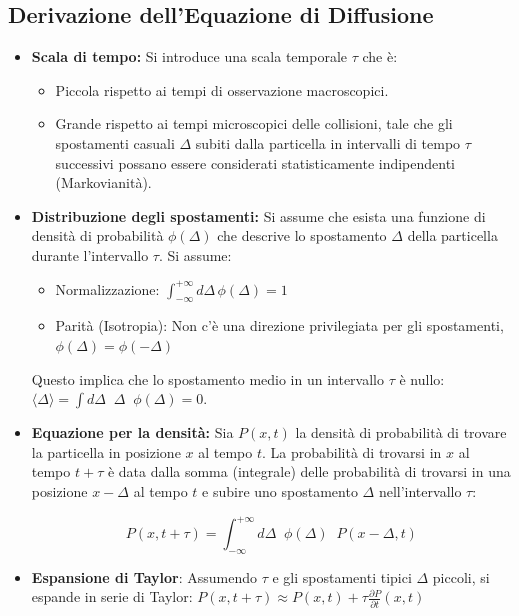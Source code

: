 \subsection{Derivazione dell'Equazione di Diffusione}
\begin{itemize}
    \item \textbf{Scala di tempo:} Si introduce una scala temporale $\tau$ che è:
    \begin{itemize}
        \item Piccola rispetto ai tempi di osservazione macroscopici.
        \item Grande rispetto ai tempi microscopici delle collisioni, tale che gli spostamenti casuali $\Delta$ subiti dalla particella in intervalli di tempo $\tau$ successivi possano essere considerati statisticamente indipendenti (Markovianità).
    \end{itemize}
    \item \textbf{Distribuzione degli spostamenti:} Si assume che esista una funzione di densità di probabilità $\phi(\Delta)$ che descrive lo spostamento $\Delta$ della particella durante l'intervallo $\tau$. Si assume:
    \begin{itemize}
        \item Normalizzazione: $\int_{-\infty}^{+\infty} d\Delta \, \phi(\Delta) = 1$
        \item Parità (Isotropia): Non c'è una direzione privilegiata per gli spostamenti, $\phi(\Delta) = \phi(-\Delta)$
    \end{itemize}
    Questo implica che lo spostamento medio in un intervallo $\tau$ è nullo:
    $\langle \Delta \rangle = \int d\Delta \; \; \Delta \; \; \phi(\Delta) = 0$.
    \item \textbf{Equazione per la densità:} Sia $P(x,t)$ la densità di probabilità di trovare la particella in posizione $x$ al tempo $t$. La probabilità di trovarsi in $x$ al tempo $t+\tau$ è data dalla somma (integrale) delle probabilità di trovarsi in una posizione $x-\Delta$ al tempo $t$ e subire uno spostamento $\Delta$ nell'intervallo $\tau$:


\begin{equation}
\label{eq:eq_7}
P(x, t+\tau) = \int_{-\infty}^{+\infty} d\Delta \; \; \phi(\Delta) \; \; P(x-\Delta, t)
\end{equation}

\item \textbf{Espansione di Taylor}: Assumendo $\tau$ e gli spostamenti tipici $\Delta$ piccoli, si espande in serie di Taylor:
$P(x, t+\tau) \approx P(x,t) + \tau \frac{\partial P}{\partial t}(x,t)$


\end{itemize}
